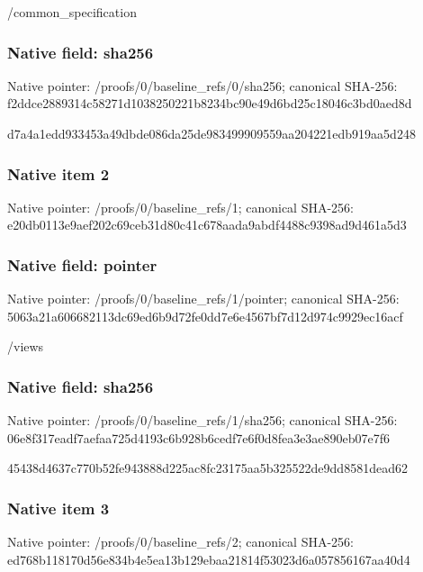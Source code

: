 \documentclass[10pt,a4paper]{article}
\begin{document}
\begingroup\raggedright\sloppy /\allowbreak{}common\_\allowbreak{}specification\par\endgroup

\subsubsection{Native field: sha256}
Native pointer: /proofs/0/baseline\_\allowbreak{}refs/0/sha256; canonical SHA-256: f2ddce2889314c58271d1038250221b8234bc90e49d6bd25c18046c3bd0aed8d

\begingroup\raggedright\sloppy d7a4a1edd933453a49dbde086da25de983499909559aa204221edb919aa5d248\par\endgroup

\subsubsection{Native item 2}
Native pointer: /proofs/0/baseline\_\allowbreak{}refs/1; canonical SHA-256: e20db0113e9aef202c69ceb31d80c41c678aada9abdf4488c9398ad9d461a5d3

\subsubsection{Native field: pointer}
Native pointer: /proofs/0/baseline\_\allowbreak{}refs/1/pointer; canonical SHA-256: 5063a21a606682113dc69ed6b9d72fe0dd7e6e4567bf7d12d974c9929ec16acf

\begingroup\raggedright\sloppy /\allowbreak{}views\par\endgroup

\subsubsection{Native field: sha256}
Native pointer: /proofs/0/baseline\_\allowbreak{}refs/1/sha256; canonical SHA-256: 06e8f317eadf7aefaa725d4193c6b928b6cedf7e6f0d8fea3e3ae890eb07e7f6

\begingroup\raggedright\sloppy 45438d4637c770b52fe943888d225ac8fc23175aa5b325522de9dd8581dead62\par\endgroup

\subsubsection{Native item 3}
Native pointer: /proofs/0/baseline\_\allowbreak{}refs/2; canonical SHA-256: ed768b118170d56e834b4e5ea13b129ebaa21814f53023d6a057856167aa40d4
\end{document}
